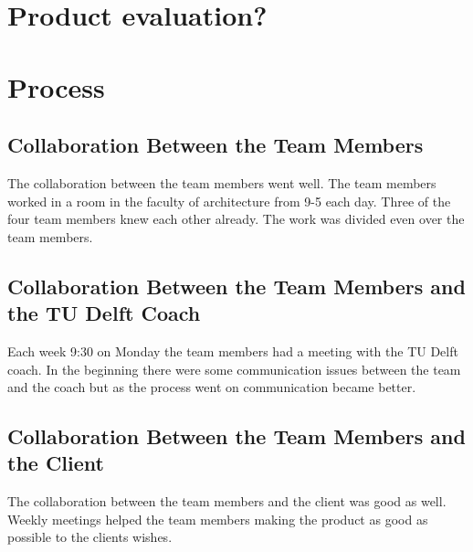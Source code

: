 \section{Product evaluation?}



\section{Process}

\subsection{Collaboration Between the Team Members}
The collaboration between the team members went well. The team members worked in a room in the faculty of architecture from 9-5 each day. Three of the four team members knew each other already. The work was divided even over the team members. 

\subsection{Collaboration Between the Team Members and the TU Delft Coach}
Each week 9:30 on Monday the team members had a meeting with the TU Delft coach. In the beginning there were some communication issues between the team and the coach but as the process went on communication became better.

\subsection{Collaboration Between the Team Members and the Client}
The collaboration between the team members and the client was good as well. 
Weekly meetings helped the team members making the product as good as possible to the clients wishes. 